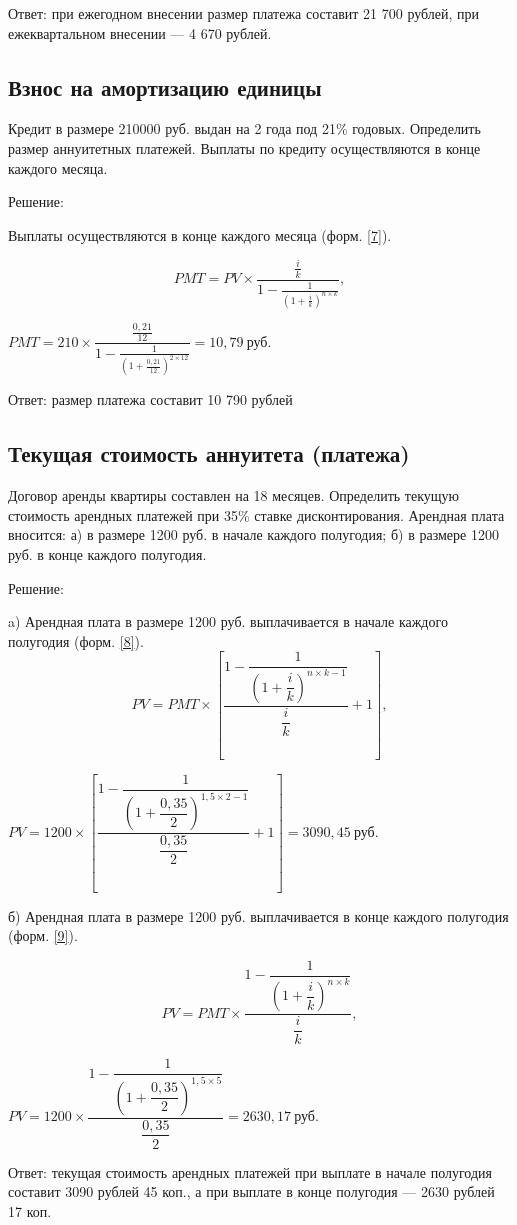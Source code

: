 Ответ: при ежегодном внесении размер платежа составит 21 700 рублей, при ежеквартальном внесении --- 4 670 рублей.

\subsection{Взнос на амортизацию единицы}

Кредит в размере 210000 руб. выдан на 2 года под 21\% годовых. 
Определить размер аннуитетных платежей. Выплаты по кредиту осуществляются в конце каждого месяца.

Решение:

Выплаты осуществляются в конце каждого месяца (форм. \ref{7}).

\begin{equation}\label{7}
PMT =PV \times\dfrac{\frac{i}{k}}{1-\frac{1}{(1+\frac{i}{k})^{n \times k}}},
\end{equation}

$ PMT =210 \times\dfrac{\frac{0,21}{12}}{1-\frac{1}{(1+\frac{0,21}{12})^{2 \times 12}}} = 10,79\  \text{руб.} $

Ответ: размер платежа составит 10 790 рублей

\subsection{Текущая стоимость аннуитета (платежа)}

Договор аренды квартиры составлен на 18 месяцев. Определить текущую стоимость арендных платежей при 35\% ставке дисконтирования. Арендная плата вносится: а) в размере 1200 руб. в начале каждого полугодия; б) в размере 1200 руб. в конце каждого полугодия.

Решение:

a) Арендная плата в размере 1200 руб. выплачивается в начале каждого полугодия (форм. \ref{8}).
\begin{equation}\label{8}
PV = PMT \times \left[\dfrac{1-\dfrac{1}{\left(1+\dfrac{i}{k}\right)^{n \times k -1}}}{\dfrac{i}{k}}+1\right],
\end{equation}

$PV = 1200 \times \left[\dfrac{1-\dfrac{1}{\left(1+\dfrac{0,35}{2}\right)^{1,5 \times 2 -1}}}{\dfrac{0,35}{2}}+1\right] = 3090,45\  \text{руб.} $

б) Арендная плата в размере 1200 руб. выплачивается в конце каждого полугодия (форм. \ref{9}).

\begin{equation}\label{9}
PV = PMT \times \dfrac{1-\dfrac{1}{\left(1+\dfrac{i}{k}\right)^{n \times k}}}{\dfrac{i}{k}},
\end{equation}

$ PV = 1200 \times \dfrac{1-\dfrac{1}{\left(1+\dfrac{0,35}{2}\right)^{1,5 \times 5}}}{\dfrac{0,35}{2}} = 2630,17\  \text{руб.} $

Ответ: текущая стоимость арендных платежей при выплате в начале полугодия составит 3090 рублей 45 коп., а при выплате в конце полугодия --- 2630 рублей 17 коп.


